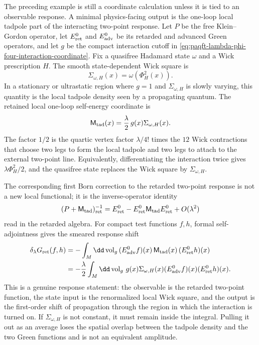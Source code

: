 The preceding example is still a coordinate calculation unless it is tied to
an observable response.  A minimal physics-facing output is the one-loop local
tadpole part of the interacting two-point response.  Let \(P\) be the free
Klein--Gordon operator, let \(E_{\rm ret}^0\) and \(E_{\rm adv}^0\) be its
retarded and advanced Green operators, and let \(g\) be the compact
interaction cutoff in
\eqref{eq:paqft-lambda-phi-four-interaction-coordinate}.  Fix a quasifree
Hadamard state \(\omega\) and a Wick prescription \(H\).  The smooth
state-dependent Wick square is
\[
  \Sigma_{\omega,H}(x)=\omega\!\left(\Phi_H^2(x)\right).
\]
In a stationary or ultrastatic region where \(g=1\) and
\(\Sigma_{\omega,H}\) is slowly varying, this quantity is the local tadpole
density seen by a propagating quantum.  The retained local one-loop
self-energy coordinate is
\begin{equation}
  \mathsf M_{\rm tad}(x)
  =
  \frac{\lambda}{2}\,g(x)\Sigma_{\omega,H}(x).
  \label{eq:paqft-tadpole-mass-coordinate}
\end{equation}
The factor \(1/2\) is the quartic vertex factor
\(\lambda/4!\) times the \(12\) Wick contractions that choose two legs to
form the local tadpole and two legs to attach to the external two-point
line.  Equivalently, differentiating the interaction twice gives
\(\lambda\Phi_H^2/2\), and the quasifree state replaces the Wick square by
\(\Sigma_{\omega,H}\).

The corresponding first Born correction to the retarded two-point response
is not a new local functional; it is the inverse-operator identity
\[
  (P+\mathsf M_{\rm tad})^{-1}_{\rm ret}
  =
  E_{\rm ret}^0
  -
  E_{\rm ret}^0\mathsf M_{\rm tad}E_{\rm ret}^0
  +O(\lambda^2)
\]
read in the retarded algebra.  For compact test functions \(f,h\), formal
self-adjointness gives the smeared response shift
\begin{equation}
\begin{aligned}
  \delta_\lambda G_{\rm ret}(f,h)
  &=
  -\int_M\dd\operatorname{vol}_g\,
    (E_{\rm adv}^0f)(x)\,
    \mathsf M_{\rm tad}(x)\,
    (E_{\rm ret}^0h)(x)\\
  &=
  -\frac{\lambda}{2}
  \int_M\dd\operatorname{vol}_g\,
    g(x)\Sigma_{\omega,H}(x)
    (E_{\rm adv}^0f)(x)(E_{\rm ret}^0h)(x).
\end{aligned}
  \label{eq:paqft-tadpole-born-response}
\end{equation}
This is a genuine response statement: the observable is the retarded
two-point function, the state input is the renormalized local Wick square,
and the output is the first-order shift of propagation through the region in
which the interaction is turned on.  If \(\Sigma_{\omega,H}\) is not
constant, it must remain inside the integral.  Pulling it out as an average
loses the spatial overlap between the tadpole density and the two Green
functions and is not an equivalent amplitude.

